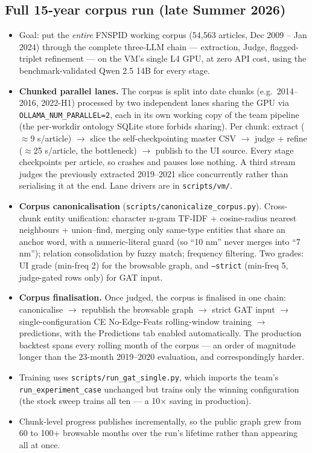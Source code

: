 \documentclass[11pt]{article}
\begin{document}
\subsection{Full 15-year corpus run (late Summer 2026)}
\begin{itemize}
  \item Goal: put the \emph{entire} FNSPID working corpus (54{,}563 articles, Dec 2009 -- Jan 2024) through the complete three-LLM chain --- extraction, Judge, flagged-triplet refinement --- on the VM's single L4 GPU, at zero API cost, using the benchmark-validated Qwen 2.5 14B for every stage.
  \item \textbf{Chunked parallel lanes.} The corpus is split into date chunks (e.g.\ 2014--2016, 2022-H1) processed by two independent lanes sharing the GPU via \texttt{OLLAMA\_NUM\_PARALLEL=2}, each in its own working copy of the team pipeline (the per-workdir ontology SQLite store forbids sharing). Per chunk: extract (\(\approx\)9 s/article) \(\to\) slice the self-checkpointing master CSV \(\to\) judge + refine (\(\approx\)25 s/article, the bottleneck) \(\to\) publish to the UI source. Every stage checkpoints per article, so crashes and pauses lose nothing. A third stream judges the previously extracted 2019--2021 slice concurrently rather than serialising it at the end. Lane drivers are in \texttt{scripts/vm/}.
  \item \textbf{Corpus canonicalisation} (\texttt{scripts/canonicalize\_corpus.py}). Cross-chunk entity unification: character n-gram TF-IDF + cosine-radius nearest neighbours + union--find, merging only same-type entities that share an anchor word, with a numeric-literal guard (so ``10 nm'' never merges into ``7 nm''); relation consolidation by fuzzy match; frequency filtering. Two grades: UI grade (min-freq 2) for the browsable graph, and \texttt{--strict} (min-freq 5, judge-gated rows only) for GAT input.
  \item \textbf{Corpus finalisation.} Once judged, the corpus is finalised in one chain: canonicalise \(\to\) republish the browsable graph \(\to\) strict GAT input \(\to\) single-configuration CE No-Edge-Feats rolling-window training \(\to\) predictions, with the Predictions tab enabled automatically. The production backtest spans every rolling month of the corpus --- an order of magnitude longer than the 23-month 2019--2020 evaluation, and correspondingly harder.
  \item Training uses \texttt{scripts/run\_gat\_single.py}, which imports the team's \texttt{run\_experiment\_case} unchanged but trains only the winning configuration (the stock sweep trains all ten --- a 10\(\times\) saving in production).
  \item Chunk-level progress publishes incrementally, so the public graph grew from 60 to 100+ browsable months over the run's lifetime rather than appearing all at once.
\end{itemize}
\end{document}
